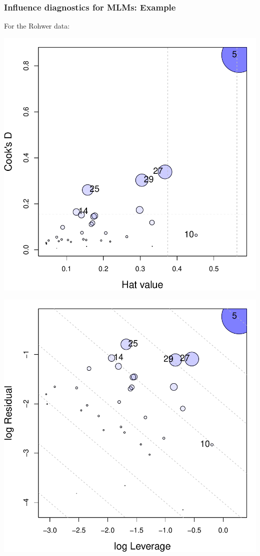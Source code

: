 \begin{frame}
  \frametitle{Influence diagnostics for MLMs: Example}
  For the Rohwer data:

  \begin{minipage}[c]{.5\textwidth}
   \includegraphics[width=1\linewidth,clip]{figures/rohwer-influence-cookd.pdf}
   \end{minipage}%
  \hfill
  \begin{minipage}[c]{.5\textwidth}
   \includegraphics[width=1\linewidth,clip]{figures/rohwer-influence-LR.pdf}
  \end{minipage}

\end{frame}

